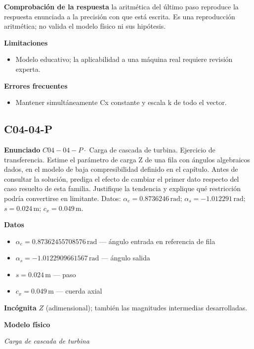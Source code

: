 \documentclass[10pt,openany]{book}
\begin{document}
\noindent\textbf{Comprobación de la respuesta} la aritmética del último paso reproduce la respuesta enunciada a la precisión con que está escrita. Es una reproducción aritmética; no valida el modelo físico ni sus hipótesis.

\noindent\textbf{Limitaciones}
\begin{itemize}
\item Modelo educativo; la aplicabilidad a una máquina real requiere revisión experta.
\end{itemize}

\noindent\textbf{Errores frecuentes}
\begin{itemize}
\item Mantener simultáneamente Cx constante y escala k de todo el vector.
\end{itemize}
\subsection*{C04-04-P}

\noindent\textbf{Enunciado}
\(C04-04-P \cdot\) Carga de cascada de turbina. Ejercicio de transferencia. Estime el parámetro de carga Z de una fila con ángulos algebraicos dados, en el modelo de baja compresibilidad definido en el capítulo. Antes de consultar la solución, prediga el efecto de cambiar el primer dato respecto del caso resuelto de esta familia. Justifique la tendencia y explique qué restricción podría convertirse en limitante. Datos: \(\alpha_e=0.8736246\, \mathrm{rad}\); \(\alpha_s=-1.012291\, \mathrm{rad}\); \(s=0.024\, \mathrm{m}\); \(c_x=0.049\, \mathrm{m}\).

\noindent\textbf{Datos}
\begin{itemize}
\item $\alpha_e = 0.87362455708576\,\mathrm{rad}$ — ángulo entrada en referencia de fila
\item $\alpha_s = -1.0122909661567\,\mathrm{rad}$ — ángulo salida
\item $s = 0.024\,\mathrm{m}$ — paso
\item $c_x = 0.049\,\mathrm{m}$ — cuerda axial
\end{itemize}

\noindent\textbf{Incógnita}
$Z$ (adimensional); también las magnitudes intermedias desarrolladas.

\noindent\textbf{Modelo físico}

\noindent\textit{Carga de cascada de turbina}
\end{document}
